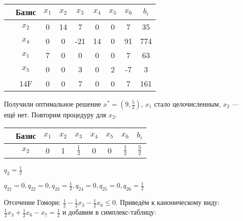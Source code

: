 \begin{table}[H]
    \centering
    \begin{tabular}{|c|c|c|c|c|c|c|c|c|}
        \hline
         & Базис & $x_1$ & $x_2$ & $x_3$ & $x_4$ & $x_5$ & $x_6$ & $b_i$ \\ \hline
         & $x_2$ & 0     & 14    & 7     & 0     & 0     & 7     & 35    \\ \hline
         & $x_4$ & 0     & 0     & -21   & 14    & 0     & 91    & 774   \\ \hline
         & $x_1$ & 7     & 0     & 0     & 0     & 0     & 7     & 63    \\ \hline
         & $x_5$ & 0     & 0     & 3     & 0     & 2     & -7    & 3     \\ \hline
         & 14F   & 0     & 0     & 7     & 0     & 0     & 7     & 161   \\ \hline
    \end{tabular}
\end{table}

Получили оптимальное решение $x^* = (9, \frac{ 5}{ 2})$, $x_1$ стало целочисленным, $x_2$ --- ещё нет. Повторим процедуру для $x_2$.

\begin{table}[H]
    \centering
    \begin{tabular}{|c|c|c|c|c|c|c|c|c|}
        \hline
         & Базис & $x_1$ & $x_2$ & $x_3$            & $x_4$ & $x_5$ & $x_6$            & $b_i$          \\ \hline
         & $x_2$ & 0     & 1     & $ \frac{ 1}{ 2}$ & 0     & 0     & $ \frac{ 1}{ 2}$ & $ \frac{5}{2}$ \\ \hline
    \end{tabular}
\end{table}

$q_2 = \frac{ 1}{ 2}$

$q_{21} = 0, q_{22} = 0, q_{23} = \frac{ 1}{ 2}, q_{24} = 0, q_{25} = 0, q_{26} = \frac{ 1}{ 2}$

Отсечение Гомори: $ \frac{ 1}{ 2} - \frac{ 1}{ 2}x_3 - \frac{ 1}{ 2}x_6 \leq 0 $. Приведём к каноническому виду: $ \frac{ 1}{ 2}x_3 + \frac{ 1}{ 2}x_6 - x_7 = \frac{ 1}{ 2} $ и добавим в симплекс-таблицу:

